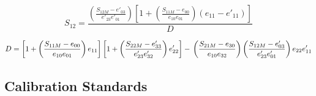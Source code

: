 \begin{equation}
S_{12}=\frac{\left( \frac{S_{12M}-e'_{03}}{e'_{23}e'_{01}}\right)\left[1+\left(\frac{S_{11M}-e_{00}}{e_{10}e_{01}}\right)\left(e_{11}-e'_{11}\right)\right]}{D}
\end{equation}

\begin{equation}
D=\left[1+\left(\frac{S_{11M}-e_{00}}{e_{10}e_{01}}\right)e_{11}\right]\left[1+\left(\frac{S_{22M}-e'_{33}}{e'_{23}e'_{32}}\right)e'_{22}\right]- \\ \left(\frac{S_{21M}-e_{30}}{e_{10}e_{32}}\right) \left(\frac{S_{12M}-e'_{03}}{e'_{23}e'_{01}}\right)e_{22}e'_{11}
\end{equation}
\normalsize
\subsection{Calibration Standards}
\label{sec:calstds}

